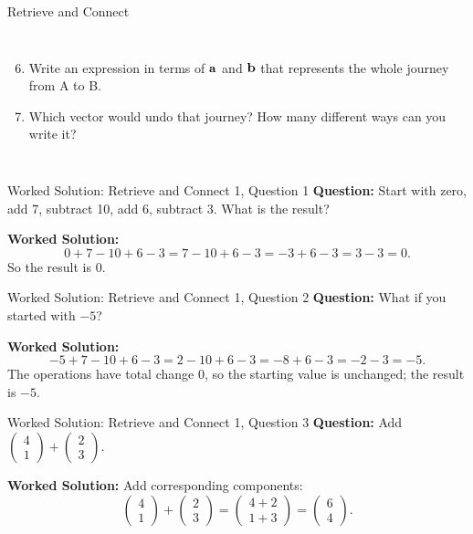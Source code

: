 \documentclass{beamer}
\newcommand{\ashow}[1]{\uncover<2->{\textcolor{red}{\small #1}}}
\begin{document}
\begin{frame}{Retrieve and Connect}
\begin{columns}[T]

\begin{enumerate}
    \setcounter{enumi}{5}
  \item Write an expression in terms of $\bf{a}$ and $\bf{b}$ that represents the whole journey from A to B. \ashow{\(\mathbf{a}+\mathbf{b}\)}
  \item Which vector would undo that journey? How many different ways can you write it? \ashow{\(\overrightarrow{BA} = -(\mathbf{a}+\mathbf{b}) = -\mathbf{a}-\mathbf{b}\)}
\end{enumerate}

\end{columns}

\end{frame}

\begin{frame}{Worked Solution: Retrieve and Connect 1, Question 1}
\hypertarget{work-st1}{}
\textbf{Question:} Start with zero, add 7, subtract 10, add 6, subtract 3. What is the result?

\textbf{Worked Solution:}
\[
0+7-10+6-3 = 7-10+6-3 = -3+6-3 = 3-3 = 0.
\]
So the result is \(0\).

\end{frame}

\begin{frame}{Worked Solution: Retrieve and Connect 1, Question 2}
\textbf{Question:} What if you started with $-5$?

\textbf{Worked Solution:}
\[
-5+7-10+6-3 = 2-10+6-3 = -8+6-3 = -2-3 = -5.
\]
The operations have total change \(0\), so the starting value is unchanged; the result is \(-5\).

\end{frame}

\begin{frame}{Worked Solution: Retrieve and Connect 1, Question 3}
\textbf{Question:} Add \(\begin{pmatrix}4\\1\end{pmatrix} + \begin{pmatrix}2\\3\end{pmatrix}\).

\textbf{Worked Solution:}
Add corresponding components:
\[
\begin{pmatrix}4\\1\end{pmatrix}
+
\begin{pmatrix}2\\3\end{pmatrix}
=
\begin{pmatrix}4+2\\1+3\end{pmatrix}
=
\begin{pmatrix}6\\4\end{pmatrix}.
\]

\end{frame}
\end{document}
